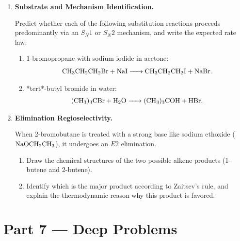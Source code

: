 \documentclass[12pt, a4paper]{book}
\begin{document}
\begin{problembox}
\begin{enumerate}[label=\textbf{P\arabic*.}]
  \item \textbf{Substrate and Mechanism Identification.}
  
        Predict whether each of the following substitution reactions proceeds predominantly via an $S_N1$ or $S_N2$ mechanism, and write the expected rate law:
        \begin{enumerate}[label=(\alph*)]
          \item 1-bromopropane with sodium iodide in acetone:
                \[
                  \ce{CH3CH2CH2Br + NaI -> CH3CH2CH2I + NaBr}.
                \]
          \item *tert*-butyl bromide in water:
                \[
                  \ce{(CH3)3CBr + H2O -> (CH3)3COH + HBr}.
                \]
        \end{enumerate}

  \item \textbf{Elimination Regioselectivity.}
  
        When 2-bromobutane is treated with a strong base like sodium ethoxide ($\ce{NaOCH2CH3}$), it undergoes an $E2$ elimination.
        \begin{enumerate}[label=(\alph*)]
          \item Draw the chemical structures of the two possible alkene products (1-butene and 2-butene).
          \item Identify which is the major product according to Zaitsev's rule, and explain the thermodynamic reason why this product is favored.
        \end{enumerate}
\end{enumerate}
\end{problembox}

\newpage

\section{Part 7 --- Deep Problems}
\end{document}
